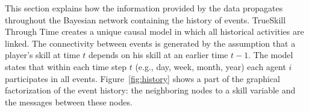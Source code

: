 \documentclass[article]{jss}
\begin{document}
This section explains how the information provided by the data propagates throughout the Bayesian network containing the history of events. 
TrueSkill Through Time creates a unique causal model in which all historical activities are linked. 
The connectivity between events is generated by the assumption that a player's skill at time $t$ depends on his skill at an earlier time $t-1$. 
The model states that within each time step $t$ (e.g., day, week, month, year) each agent $i$ participates in all events. 
Figure~\ref{fig:history} shows a part of the graphical factorization of the event history: the neighboring nodes to a skill variable and the messages between these nodes. 
%
\begin{figure}[ht!]
  \centering
\end{figure}
\end{document}
